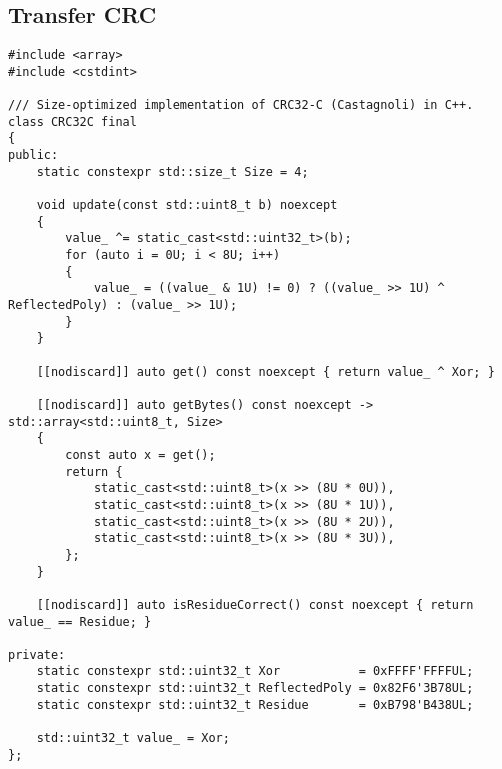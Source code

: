 \subsection{Transfer CRC}

\begin{samepage}
\begin{verbatim}
#include <array>
#include <cstdint>

/// Size-optimized implementation of CRC32-C (Castagnoli) in C++.
class CRC32C final
{
public:
    static constexpr std::size_t Size = 4;

    void update(const std::uint8_t b) noexcept
    {
        value_ ^= static_cast<std::uint32_t>(b);
        for (auto i = 0U; i < 8U; i++)
        {
            value_ = ((value_ & 1U) != 0) ? ((value_ >> 1U) ^ ReflectedPoly) : (value_ >> 1U);
        }
    }

    [[nodiscard]] auto get() const noexcept { return value_ ^ Xor; }

    [[nodiscard]] auto getBytes() const noexcept -> std::array<std::uint8_t, Size>
    {
        const auto x = get();
        return {
            static_cast<std::uint8_t>(x >> (8U * 0U)),
            static_cast<std::uint8_t>(x >> (8U * 1U)),
            static_cast<std::uint8_t>(x >> (8U * 2U)),
            static_cast<std::uint8_t>(x >> (8U * 3U)),
        };
    }

    [[nodiscard]] auto isResidueCorrect() const noexcept { return value_ == Residue; }

private:
    static constexpr std::uint32_t Xor           = 0xFFFF'FFFFUL;
    static constexpr std::uint32_t ReflectedPoly = 0x82F6'3B78UL;
    static constexpr std::uint32_t Residue       = 0xB798'B438UL;

    std::uint32_t value_ = Xor;
};
\end{verbatim}
\end{samepage}

\newpage

